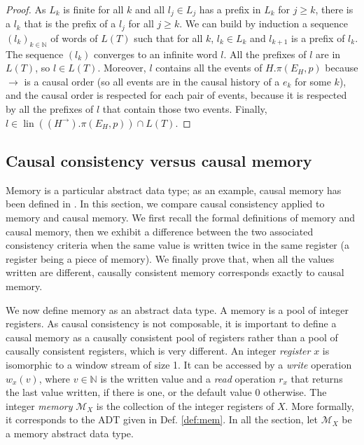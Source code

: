 \documentclass[9pt,numbers]{sigplanconf}
\DeclareMathOperator{\lin}{lin}
\begin{document}
\begin{proof}
  As $L_k$ is finite for all $k$ and all $l_j\in L_j$ has a prefix in $L_k$ for $j\ge k$, there is a $l_k$ that
  is the prefix of a $l_j$ for all $j\ge k$. We can build by induction a sequence $(l_k)_{k\in \mathbb{N}}$ of words of $L(T)$ such that for all $k$, $l_k\in L_k$
  and $l_{k+1}$ is a prefix of $l_k$. The sequence $(l_k)$ converges to an infinite word $l$.
  All the prefixes of $l$ are in $L(T)$, so $l\in L(T)$. Moreover, $l$ contains all the events of $H.\pi(E_H, p)$ because
  $\rightarrow$ is a causal order (so all events are in the causal history of a $e_k$ for some $k$), and 
  the causal order is respected for each pair of events, because it is respected by all the prefixes of $l$
  that contain those two events. Finally, $l\in \lin\left((H^{\rightarrow}).\pi(E_H, p)\right)\cap L(T)$.
\end{proof}

\subsection{Causal consistency versus causal memory}\label{sec:causal_memory}


Memory is a particular abstract data type; as an example, causal memory has been defined in \cite{ahamad1995causal}.
In this section, we compare causal consistency applied to memory and causal memory. We first 
recall the formal definitions of memory and causal memory, then we exhibit a difference between the two associated consistency criteria when the same value is written twice in the same register (a register being a piece of memory).
We finally prove that, when all the values written are different, causally consistent memory corresponds exactly
to causal memory.

\pagebreak
We now define memory as an abstract data type. A memory is a pool of integer registers. 
As causal consistency is not composable, it is important to define a causal memory 
as a causally consistent pool of registers rather than a pool of causally consistent registers, which is very different.
An integer \emph{register} $x$ is isomorphic to a window stream of size 1. 
It can be accessed by a \emph{write} operation $w_x(v)$, where $v\in \mathbb{N}$ is the written value and 
a \emph{read} operation $r_x$ that returns the last value written, if there is one, 
or the default value $0$ otherwise. The integer \emph{memory} $\mathcal{M}_X$ is 
the collection of the integer registers of $X$. More formally, it corresponds
to the ADT given in Def. \ref{def:mem}. 
In all the section, let $\mathcal{M}_X$ be a memory abstract data type. 
\end{document}

